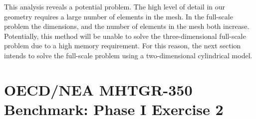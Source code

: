 This analysis reveals a potential problem.
The high level of detail in our geometry requires a large number of elements in the mesh.
In the full-scale problem the dimensions, and the number of elements in the mesh both increase.
Potentially, this method will be unable to solve the three-dimensional full-scale problem due to a high memory requirement.
For this reason, the next section intends to solve the full-scale problem using a two-dimensional cylindrical model.



\section{OECD/NEA MHTGR-350 Benchmark: Phase I Exercise 2}
\label{sec:ph1ex2}

